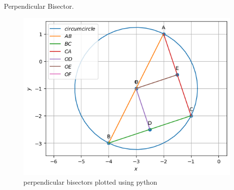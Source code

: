 \begin{table}[H]
        \centering
        
        \caption{Perpendicular Bisector.}
        \label{tab:perp_bisec}
    \end{table}
\begin{figure}[H]
\includegraphics[width=\columnwidth]{1-4/figs/perp_bisec.png}
\caption{perpendicular bisectors plotted using python}
\label{fig:i_perp_bisec_py}
\end{figure}
